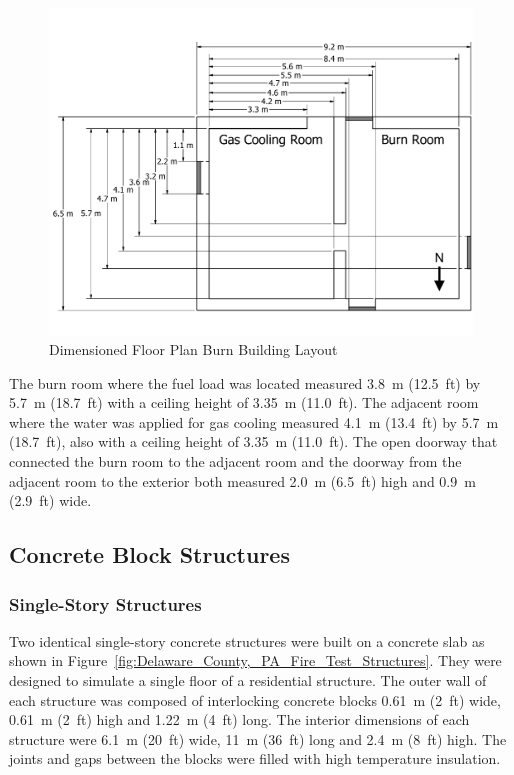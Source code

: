 \documentclass[12pt,oneside]{book}
\begin{document}
\begin{figure}[!ht]
	\includegraphics[width=\columnwidth]{../Figures/Floor_Plans/PDFs/West_Structure/DelCo_2012_West_Structure_Plain}
	\caption{Dimensioned Floor Plan Burn Building Layout}
	\label{fig:Delaware_County,_PA_Burn_Building_Layout}
\end{figure}

The burn room where the fuel load was located measured 3.8~m (12.5~ft) by 5.7~m (18.7~ft) with a ceiling height of 3.35~m (11.0~ft). The adjacent room where the water was applied for gas cooling measured 4.1~m (13.4~ft) by 5.7~m (18.7~ft), also with a ceiling height of 3.35~m (11.0~ft). The open doorway that connected the burn room to the adjacent room and the doorway from the adjacent room to the exterior both measured 2.0~m (6.5~ft) high and 0.9~m (2.9~ft) wide.

\subsection{Concrete Block Structures}
\label{sec:Experimental Structures}
\subsubsection*{Single-Story Structures}

Two identical single-story concrete structures were built on a concrete slab as shown in Figure~\ref{fig:Delaware_County,_PA_Fire_Test_Structures}. They were designed to simulate a single floor of a residential structure.  The outer wall of each structure was composed of interlocking concrete blocks 0.61~m (2~ft) wide, 0.61~m (2~ft) high and 1.22~m (4~ft) long.  The interior dimensions of each structure were 6.1~m (20~ft) wide, 11~m (36~ft) long and 2.4~m (8~ft) high. The joints and gaps between the blocks were filled with high temperature insulation.
\end{document}
